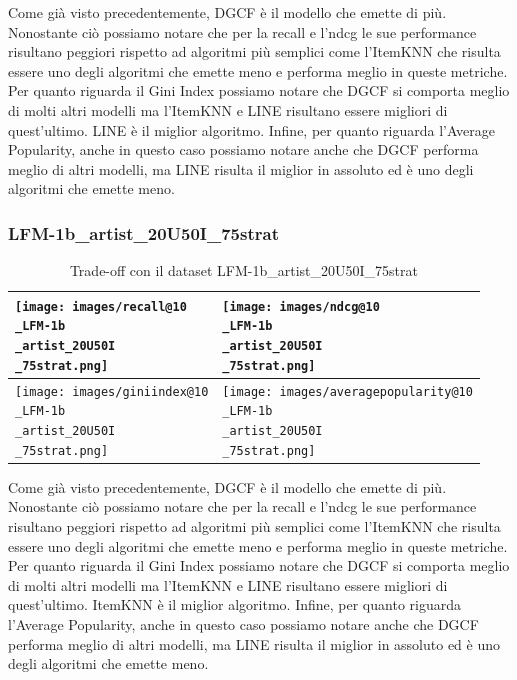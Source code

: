 \noindent Come già visto precedentemente, DGCF è il modello che emette di più. Nonostante ciò possiamo notare che per la recall e l'ndcg le sue performance risultano peggiori rispetto ad algoritmi più semplici come l'ItemKNN che risulta essere uno degli algoritmi che emette meno e performa meglio in queste metriche.
Per quanto riguarda il Gini Index possiamo notare che DGCF si comporta meglio di molti altri modelli ma l'ItemKNN e LINE risultano essere migliori di quest'ultimo. LINE è il miglior algoritmo.
Infine, per quanto riguarda l'Average Popularity, anche in questo caso possiamo notare anche che DGCF performa meglio di altri modelli, ma LINE risulta il miglior in assoluto ed è uno degli algoritmi che emette meno.


\subsubsection{LFM-1b\_artist\_20U50I\_75strat}


\begin{table}[H]
    \centering
    \footnotesize
    \setlength\tabcolsep{0pt}
    \begin{tabularx}{\textwidth}{|X|X|}
        \hline
        \texttt{[image: images/recall@10\\\_LFM-1b\\\_artist\_20U50I\\\_75strat.png]} &
        \texttt{[image: images/ndcg@10\\\_LFM-1b\\\_artist\_20U50I\\\_75strat.png]} \\
        \hline
        \texttt{[image: images/giniindex@10\\\_LFM-1b\\\_artist\_20U50I\\\_75strat.png]} &
        \texttt{[image: images/averagepopularity@10\\\_LFM-1b\\\_artist\_20U50I\\\_75strat.png]} \\
        \hline
    \end{tabularx}
    \caption{Trade-off con il dataset LFM-1b\_artist\_20U50I\_75strat}
    \label{tab:emissions_info}
\end{table}


\noindent Come già visto precedentemente, DGCF è il modello che emette di più. Nonostante ciò possiamo notare che per la recall e l'ndcg le sue performance risultano peggiori rispetto ad algoritmi più semplici come l'ItemKNN che risulta essere uno degli algoritmi che emette meno e performa meglio in queste metriche.
Per quanto riguarda il Gini Index possiamo notare che DGCF si comporta meglio di molti altri modelli ma l'ItemKNN e LINE risultano essere migliori di quest'ultimo. ItemKNN è il miglior algoritmo.
Infine, per quanto riguarda l'Average Popularity, anche in questo caso possiamo notare anche che DGCF performa meglio di altri modelli, ma LINE risulta il miglior in assoluto ed è uno degli algoritmi che emette meno.






